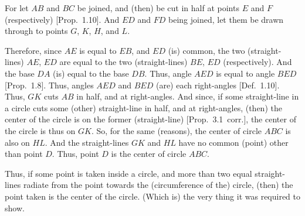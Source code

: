 \begin{Parallel}{}{}
{\epsfysize=2.2in
\centerline{}

For let $AB$ and $BC$ be joined, and (then) be cut in half at points $E$ and $F$ 
(respectively) [Prop.~1.10]. And $ED$ and $FD$ being joined, let them be
drawn through to points $G$, $K$, $H$, and $L$.

Therefore, since $AE$ is equal to $EB$, and $ED$ (is) common, the two (straight-lines) $AE$, $ED$ are equal to the two (straight-lines) $BE$, $ED$ (respectively). And the 
base $DA$ (is) equal to the base $DB$. Thus, angle $AED$ is equal to
angle $BED$ [Prop.~1.8]. Thus, angles $AED$ and $BED$ (are) each right-angles [Def.~1.10]. Thus, $GK$ cuts $AB$ in half, and at right-angles. And since,
if some straight-line in a circle cuts some (other) straight-line in half,
and at right-angles, (then) the center of the circle is on the former (straight-line)
[Prop.~3.1~corr.], the center of the circle is thus on $GK$. So, for the
same (reasons), the center of circle $ABC$ is also on $HL$. And the straight-lines
$GK$ and $HL$ have no  common (point) other than point $D$. Thus, point
$D$ is the center of circle $ABC$.

Thus, if some point is taken inside a circle, and more than two equal straight-lines
radiate from the point towards the (circumference of the) circle, (then) the
point taken  is the center of the circle. (Which is) the very thing it was
required to show.}
\end{Parallel}

